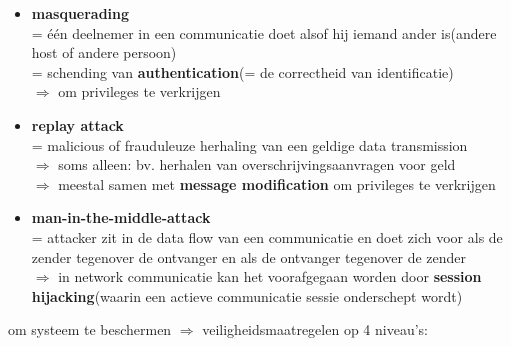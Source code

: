 \documentclass{report}
\begin{document}
\begin{itemize}
\item \textbf{masquerading}
\\= \'e\'en deelnemer in een communicatie doet alsof hij iemand ander is(andere host of andere persoon)
\\= schending van \textbf{authentication}(= de correctheid van identificatie)
\\$\Rightarrow$ om privileges te verkrijgen
\item \textbf{replay attack}
\\= malicious of frauduleuze herhaling van een geldige data transmission
\\$\Rightarrow$ soms alleen: bv. herhalen van overschrijvingsaanvragen voor geld
\\$\Rightarrow$ meestal samen met \textbf{message modification} om privileges te verkrijgen
\item \textbf{man-in-the-middle-attack}
\\= attacker zit in de data flow van een communicatie en doet zich voor als de zender tegenover de ontvanger en als de ontvanger tegenover de zender
\\$\Rightarrow$ in network communicatie kan het voorafgegaan worden door \textbf{session hijacking}(waarin een actieve communicatie sessie onderschept wordt)
\end{itemize}
om systeem te beschermen $\Rightarrow$ veiligheidsmaatregelen op 4 niveau's:
\end{document}
